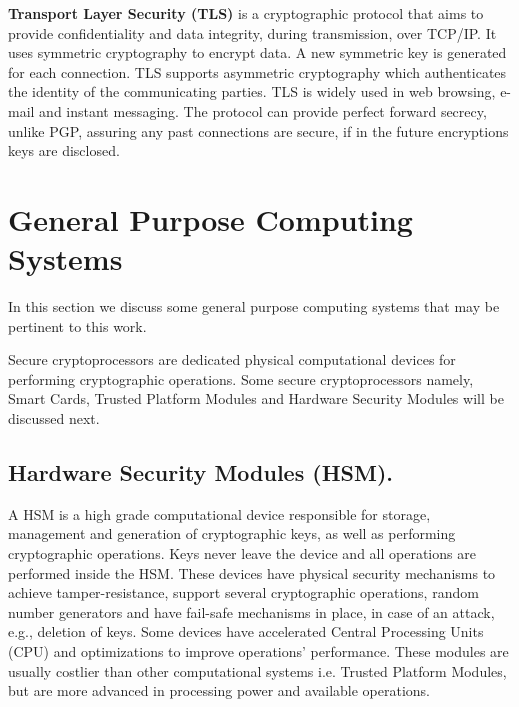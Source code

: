\textbf{Transport Layer Security (TLS)} is a cryptographic protocol that aims to provide confidentiality and data integrity, during transmission, over TCP/IP. It uses symmetric cryptography to encrypt data. A new symmetric key is generated for each connection.
TLS supports asymmetric cryptography which authenticates the identity of the communicating parties.
TLS is widely used in web browsing, e-mail and instant messaging.
The protocol can provide perfect forward secrecy, unlike PGP, assuring any past connections are secure, if in the future encryptions keys are disclosed.


\section{General Purpose Computing Systems} \label{computing}

In this section we discuss some general purpose computing systems that may be pertinent to this work. 

Secure cryptoprocessors are dedicated physical computational devices for performing cryptographic operations. Some secure cryptoprocessors namely, Smart Cards, Trusted Platform Modules and Hardware Security Modules will be discussed next.

\subsection{Hardware Security Modules (HSM).} \label{computing:hsm}

A HSM is a high grade computational device responsible for storage, management and generation of cryptographic keys, as well as performing cryptographic operations. Keys never leave the device and all operations are performed inside the HSM. These devices have physical security mechanisms to achieve tamper-resistance, support several cryptographic operations, random number generators and have fail-safe mechanisms in place, in case of an attack, e.g., deletion of keys. Some devices have accelerated Central Processing Units (CPU) and optimizations to improve operations' performance.
These modules are usually costlier than other computational systems i.e. Trusted Platform Modules, but are more advanced in processing power and available operations.

